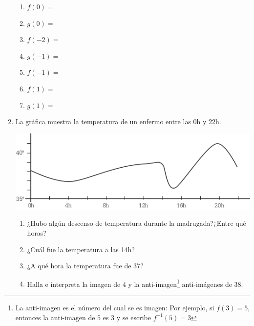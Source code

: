 \documentclass[fleqn]{article}
\begin{document}
\begin{enumerate}
\begin{minipage}{.45\textwidth}
\end{minipage}
\begin{minipage}{.5\textwidth}
\begin{enumerate}
\item $f(0)=$\noanswer
\item $g(0)=$\noanswer
\item $f(-2)=$\noanswer
\item $g(-1)=$\noanswer
\item $f(-1)=$\noanswer
\item $f(1)=$\noanswer
\item $g(1)=$\noanswer
\end{enumerate}
\end{minipage}
\item La gráfica muestra la temperatura de un enfermo entre las
0h y 22h.
\begin{center}
\includegraphics[scale=.5]{Images/PantallazoFunc.png} 
\end{center}
\begin{enumerate}
\item ¿Hubo algún descenso de temperatura durante la madrugada?¿Entre qué horas?\noanswer
\item ¿Cuál fue la temperatura a las 14h?\noanswer
\item ¿A qué hora la temperatura fue de 37\textcelsius? \noanswer
\item Halla e interpreta la imagen de 4 y la anti-imagen\footnote{La anti-imagen es el número del cual se es imagen: Por ejemplo, si $f(3)=5$, entonces la anti-imagen de 5 es 3 y se escribe $f^{-1}(5)=3$} anti-imágenes de 38\textcelsius.\noanswer

\end{enumerate}
\end{enumerate}
\end{document}
